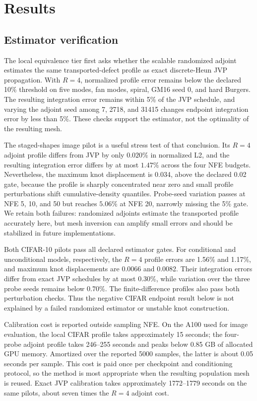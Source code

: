 \section{Results}
\label{sec:results}

\subsection{Estimator verification}
\label{sec:estimator-results}

The local equivalence tier first asks whether the scalable randomized adjoint estimates the same
transported-defect profile as exact discrete-Heun JVP propagation. With $R=4$, normalized profile
error remains below the declared 10\% threshold on five modes, fan modes, spiral, GM16 seed 0, and
hard Burgers. The resulting integration error remains within 5\% of the JVP schedule, and varying
the adjoint seed among 7, 2718, and 31415 changes endpoint integration error by less than 5\%.
These checks support the estimator, not the optimality of the resulting mesh.

The staged-shapes image pilot is a useful stress test of that conclusion. Its $R=4$ adjoint
profile differs from JVP by only $0.020\%$ in normalized L2, and the resulting integration error
differs by at most $1.47\%$ across the four NFE budgets. Nevertheless, the maximum knot
displacement is 0.034, above the declared 0.02 gate, because the profile is sharply concentrated
near zero and small profile perturbations shift cumulative-density quantiles. Probe-seed variation
passes at NFE 5, 10, and 50 but reaches $5.06\%$ at NFE 20, narrowly missing the 5\% gate. We
retain both failures: randomized adjoints estimate the transported profile accurately here, but
mesh inversion can amplify small errors and should be stabilized in future implementations.

Both CIFAR-10 pilots pass all declared estimator gates. For conditional and unconditional models,
respectively, the $R=4$ profile errors are 1.56\% and 1.17\%, and maximum knot displacements are
0.0066 and 0.0082. Their integration errors differ from exact JVP schedules by at most 0.30\%,
while variation over the three probe seeds remains below 0.70\%. The finite-difference profiles
also pass both perturbation checks. Thus the negative CIFAR endpoint result below is not explained
by a failed randomized estimator or unstable knot construction.

Calibration cost is reported outside sampling NFE. On the A100 used for image evaluation, the
local CIFAR profile takes approximately 15 seconds; the four-probe adjoint profile takes 246--255
seconds and peaks below 0.85 GB of allocated GPU memory. Amortized over the reported 5000 samples,
the latter is about 0.05 seconds per sample. This cost is paid once per checkpoint and conditioning
protocol, so the method is most appropriate when the resulting population mesh is reused. Exact
JVP calibration takes approximately 1772--1779 seconds on the same pilots, about seven times the
$R=4$ adjoint cost.

